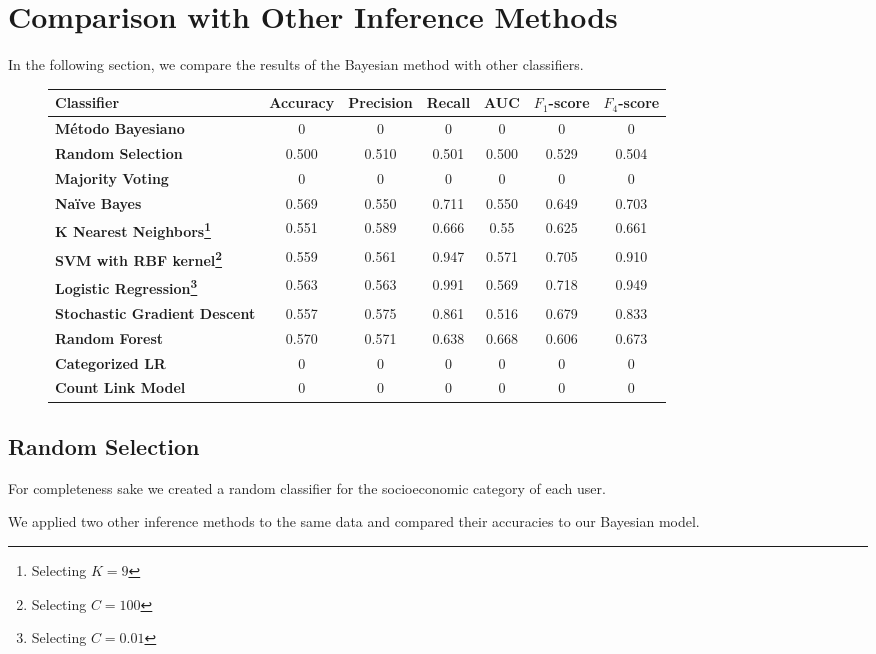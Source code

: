 \section{Comparison with Other Inference Methods}

In the following section, we compare the results of the Bayesian method with other classifiers.

\begin{figure}
	\begin{tabularx}{\textwidth}{>{\bfseries}X c c c c c c}
		\toprule
		\textbf{Classifier} & \textbf{Accuracy} & \textbf{Precision} & \textbf{Recall} & \textbf{AUC} & \textbf{$F_1$}-\textbf{score} & \textbf{$F_4$}-\textbf{score} \\
		\midrule
		Método Bayesiano & 0 & 0 & 0 & 0 & 0 & 0 \\
		\midrule
		Random Selection & 0.500 & 0.510 & 0.501 & 0.500 & 0.529 & 0.504 \\
		Majority Voting & 0 & 0 & 0 & 0 & 0 & 0 \\
		\midrule
		Naïve Bayes & 0.569 & 0.550 & 0.711 & 0.550 & 0.649 & 0.703 \\
		K Nearest Neighbors\footnote{Selecting $K = 9$} & 0.551 & 0.589 & 0.666 & 0.55 & 0.625 & 0.661 \\
		SVM with RBF kernel\footnote{Selecting $C = 100$} & 0.559 & 0.561 & 0.947 & 0.571 & 0.705 & 0.910 \\
		Logistic Regression\footnote{Selecting $C = 0.01$} & 0.563 & 0.563 & 0.991 & 0.569 & 0.718 & 0.949 \\
		Stochastic Gradient Descent & 0.557 & 0.575 & 0.861 & 0.516 & 0.679 & 0.833 \\
		Random Forest & 0.570 & 0.571 & 0.638 & 0.668 & 0.606 & 0.673 \\
		\midrule
		Categorized LR & 0 & 0 & 0 & 0 & 0 & 0 \\
		Count Link Model & 0 & 0 & 0 & 0 & 0 & 0 \\
		\bottomrule
	\end{tabularx}
\end{figure}

\subsection{Random Selection}

For completeness sake we created a random classifier for the socioeconomic category of each user.

We applied two other inference methods to the same data and compared their accuracies to our Bayesian model.


